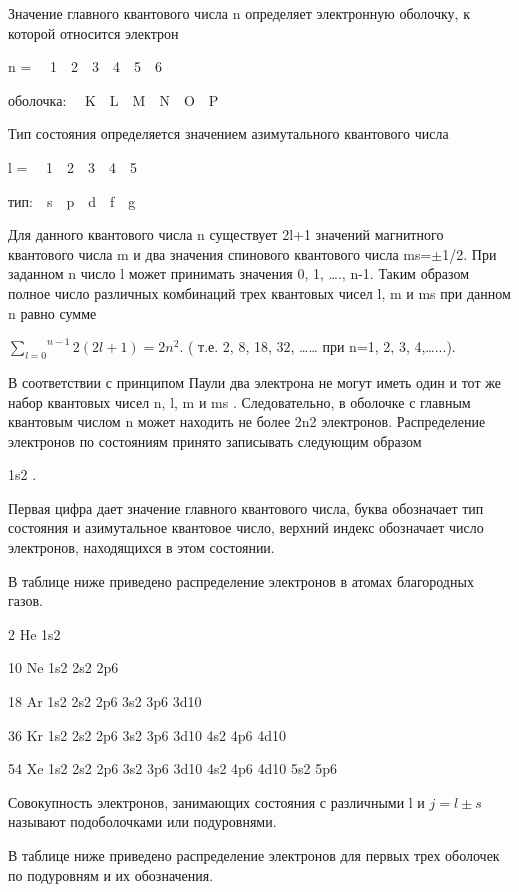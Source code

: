 \documentclass[a4paper,14pt, openany, twoside, draft]{extbook} %
\begin{document}
Значение главного квантового числа n определяет электронную оболочку, к которой относится электрон

n = \ \ 1\ \ 2\ \ 3\ \ 4\ \ 5\ \ 6

оболочка: \ \ K\ \ L\ \ M\ \ N\ \ O\ \ P

Тип состояния определяется значением азимутального квантового числа

l = \ \ 1\ \ 2\ \ 3\ \ 4\ \ 5

тип:\ \ s\ \ p\ \ d\ \ f\ \ g\ \

Для данного квантового числа n  существует 2l+1 значений магнитного квантового числа m и два значения спинового квантового числа ms=${\pm}$1/2. При заданном n число l может принимать значения 0, 1, …., n{}-1. Таким образом полное число различных комбинаций трех квантовых чисел l, m и ms при данном n равно сумме

 $\overset{n-1}{\underset{l=0}{\sum }}2(2l+1)=2n^2$.  ( т.е. 2, 8, 18, 32, …… при n=1, 2, 3, 4,…...).

В соответствии с принципом Паули два электрона не могут иметь один и тот же набор квантовых чисел  n, l, m и ms . Следовательно, в оболочке с главным квантовым числом n может находить не более 2n2 электронов. Распределение электронов по состояниям принято записывать следующим образом

1s2 .

Первая цифра дает значение главного квантового числа, буква обозначает тип состояния и азимутальное квантовое число, верхний индекс обозначает число электронов, находящихся в этом состоянии.

В таблице ниже приведено распределение электронов в атомах благородных газов.

 2 He  1s2

10 Ne  1s2  2s2  2p6

18 Ar  1s2  2s2  2p6  3s2  3p6  3d10

36 Kr  1s2  2s2  2p6  3s2  3p6  3d10  4s2 4p6  4d10

54 Xe  1s2  2s2  2p6  3s2  3p6  3d10  4s2 4p6  4d10  5s2  5p6

Совокупность электронов, занимающих состояния с различными l и   $j=l\pm s$ называют подоболочками или подуровнями.

В таблице ниже приведено распределение электронов для первых трех оболочек по подуровням и их обозначения.
\end{document}
